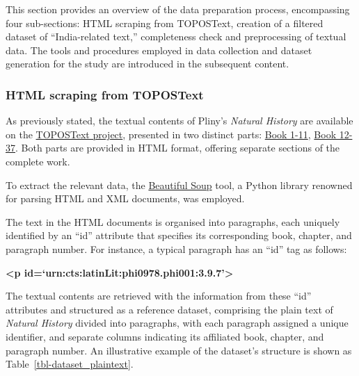 \documentclass[
  12pt,
]{article}
\begin{document}
This section provides an overview of the data preparation process,
encompassing four sub-sections: HTML scraping from TOPOSText, creation
of a filtered dataset of ``India-related text,'' completeness check and
preprocessing of textual data. The tools and procedures employed in data
collection and dataset generation for the study are introduced in the
subsequent content.

\hypertarget{html-scraping-from-topostext}{%
\subsubsection{HTML scraping from
TOPOSText}\label{html-scraping-from-topostext}}

As previously stated, the textual contents of Pliny's \emph{Natural
History} are available on the
\href{https://topostext.org/the-project}{TOPOSText project}, presented
in two distinct parts: \href{https://topostext.org/work/148}{Book 1-11},
\href{https://topostext.org/work/153}{Book 12-37}. Both parts are
provided in HTML format, offering separate sections of the complete
work.

To extract the relevant data, the
\href{https://www.crummy.com/software/BeautifulSoup/bs4/doc/}{Beautiful
Soup} tool, a Python library renowned for parsing HTML and XML
documents, was employed.

The text in the HTML documents is organised into paragraphs, each
uniquely identified by an ``id'' attribute that specifies its
corresponding book, chapter, and paragraph number. For instance, a
typical paragraph has an ``id'' tag as follows:

\textbf{\textless p
id=`urn:cts:latinLit:phi0978.phi001:3.9.7'\textgreater{}}

The textual contents are retrieved with the information from these
``id'' attributes and structured as a reference dataset, comprising the
plain text of \emph{Natural History} divided into paragraphs, with each
paragraph assigned a unique identifier, and separate columns indicating
its affiliated book, chapter, and paragraph number. An illustrative
example of the dataset's structure is shown as
Table~\ref{tbl-dataset_plaintext}.
\end{document}
